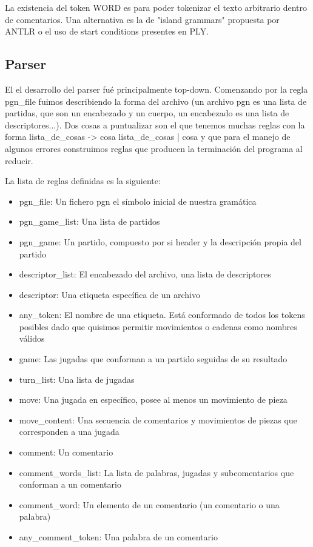 La existencia del token WORD es para poder tokenizar el texto arbitrario dentro de comentarios. Una alternativa es la de "island grammars" propuesta por ANTLR o el uso de start conditions presentes en PLY.

\subsection{Parser}


El el desarrollo del parser fué principalmente top-down. Comenzando por la regla pgn\_file fuimos describiendo la forma del archivo (un archivo pgn es una lista de partidas, que son un encabezado y un cuerpo, un encabezado es una lista de descriptores...). Dos cosas a puntualizar son el que tenemos muchas reglas con la forma lista\_de\_cosas -> cosa lista\_de\_cosas | cosa y que para el manejo de algunos errores construimos reglas que producen la terminación del programa al reducir.

La lista de reglas definidas es la siguiente:

  \begin{itemize}
    \item pgn\_file: Un fichero pgn el símbolo inicial de nuestra gramática
    \item pgn\_game\_list: Una lista de partidos
    \item pgn\_game: Un partido, compuesto por si header y la descripción propia del partido
    \item descriptor\_list: El encabezado del archivo, una lista de descriptores
    \item descriptor: Una etiqueta específica de un archivo
    \item any\_token: El nombre de una etiqueta. Está conformado de todos los tokens posibles dado que quisimos permitir movimientos o cadenas como nombres válidos
    \item game: Las jugadas que conforman a un partido seguidas de su resultado
    \item turn\_list: Una lista de jugadas
    \item move: Una jugada en específico, posee al menos un movimiento de pieza
    \item move\_content: Una secuencia de comentarios y movimientos de piezas que corresponden a una jugada
    \item comment: Un comentario
    \item comment\_words\_list: La lista de palabras, jugadas y subcomentarios que conforman a un comentario
    \item comment\_word: Un elemento de un comentario (un comentario o una palabra)
    \item any\_comment\_token: Una palabra de un comentario
\end{itemize}  
    
